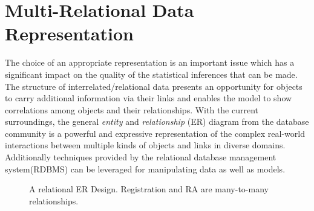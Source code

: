 \documentclass{sfuthesis}
\begin{document}
\section{Multi-Relational Data Representation}
The choice of an appropriate representation is  an important issue which has a significant impact on the quality of the statistical inferences that can be made. The structure of interrelated/relational data presents an opportunity for objects to carry additional information via their links and enables the model to show correlations among objects and their relationships. 
With the current surroundings,  the general {\em entity} and {\em relationship} (ER) diagram from the database community is a powerful and expressive representation of the complex real-world interactions between multiple kinds of objects and links in diverse domains. Additionally   techniques provided by the relational database management system(RDBMS) can be leveraged for manipulating data as well as models. 


\begin{figure}[!h] 
 \centering
{} 
\caption{A relational ER Design. Registration and RA are many-to-many relationships.}
 \label{fig:university-schema}
\end{figure} 
\end{document}
